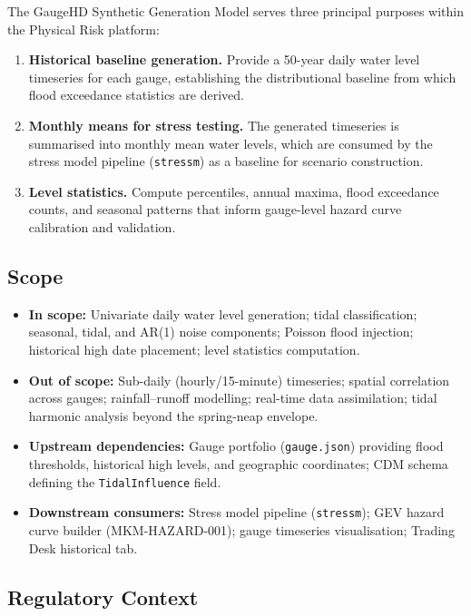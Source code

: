 \documentclass[11pt,a4paper]{article}
\begin{document}
The GaugeHD Synthetic Generation Model serves three principal purposes within the
Physical Risk platform:

\begin{enumerate}[nosep]
    \item \textbf{Historical baseline generation.} Provide a 50-year daily water level
          timeseries for each gauge, establishing the distributional baseline from which
          flood exceedance statistics are derived.
    \item \textbf{Monthly means for stress testing.} The generated timeseries is
          summarised into monthly mean water levels, which are consumed by the stress
          model pipeline (\texttt{stressm}) as a baseline for scenario construction.
    \item \textbf{Level statistics.} Compute percentiles, annual maxima, flood
          exceedance counts, and seasonal patterns that inform gauge-level hazard
          curve calibration and validation.
\end{enumerate}

\subsection{Scope}

\begin{itemize}[nosep]
    \item \textbf{In scope:} Univariate daily water level generation; tidal
          classification; seasonal, tidal, and AR(1) noise components; Poisson flood
          injection; historical high date placement; level statistics computation.
    \item \textbf{Out of scope:} Sub-daily (hourly/15-minute) timeseries; spatial
          correlation across gauges; rainfall--runoff modelling; real-time data
          assimilation; tidal harmonic analysis beyond the spring-neap envelope.
    \item \textbf{Upstream dependencies:} Gauge portfolio (\texttt{gauge.json}) providing
          flood thresholds, historical high levels, and geographic coordinates; CDM schema
          defining the \texttt{TidalInfluence} field.
    \item \textbf{Downstream consumers:} Stress model pipeline (\texttt{stressm});
          GEV hazard curve builder (MKM-HAZARD-001); gauge timeseries visualisation;
          Trading Desk historical tab.
\end{itemize}

\subsection{Regulatory Context}
\end{document}
